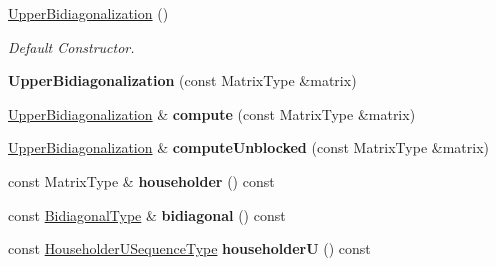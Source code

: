 \begin{DoxyCompactItemize}
\item 
\hyperlink{class_eigen_1_1internal_1_1_upper_bidiagonalization_aa37a7ca5f5e86e3efbc6907d03d89340}{Upper\+Bidiagonalization} ()
\begin{DoxyCompactList}\small\item\em Default Constructor. \end{DoxyCompactList}\item 
\mbox{\label{class_eigen_1_1internal_1_1_upper_bidiagonalization_a0be89ad4d54df169e3607031e0284e20}} 
{\bfseries Upper\+Bidiagonalization} (const Matrix\+Type \&matrix)
\item 
\mbox{\label{class_eigen_1_1internal_1_1_upper_bidiagonalization_a77c1a3dba999febcdd9aa3d8bdb7d8df}} 
\hyperlink{class_eigen_1_1internal_1_1_upper_bidiagonalization}{Upper\+Bidiagonalization} \& {\bfseries compute} (const Matrix\+Type \&matrix)
\item 
\mbox{\label{class_eigen_1_1internal_1_1_upper_bidiagonalization_a9899e0a0ee6bf4771fe4ef2d133e3e72}} 
\hyperlink{class_eigen_1_1internal_1_1_upper_bidiagonalization}{Upper\+Bidiagonalization} \& {\bfseries compute\+Unblocked} (const Matrix\+Type \&matrix)
\item 
\mbox{\label{class_eigen_1_1internal_1_1_upper_bidiagonalization_ace16851d1d267d8f86caabdba8b56dfa}} 
const Matrix\+Type \& {\bfseries householder} () const
\item 
\mbox{\label{class_eigen_1_1internal_1_1_upper_bidiagonalization_a970d328a7b5fd3ad7ee9dd42c9952577}} 
const \hyperlink{group___core___module}{Bidiagonal\+Type} \& {\bfseries bidiagonal} () const
\item 
\mbox{\label{class_eigen_1_1internal_1_1_upper_bidiagonalization_a39887f7712de5be5a0487e9f6357b9da}} 
const \hyperlink{group___householder___module_class_eigen_1_1_householder_sequence}{Householder\+U\+Sequence\+Type} {\bfseries householderU} () const
\item 

\end{DoxyCompactItemize}
